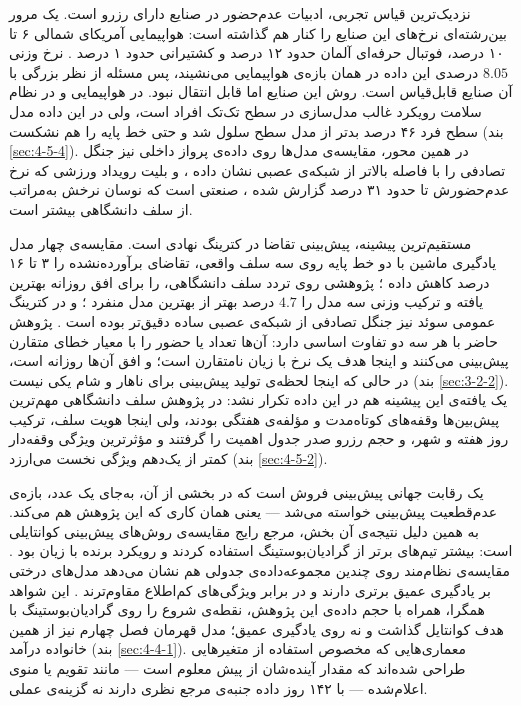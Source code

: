 نزدیک‌ترین قیاس تجربی، ادبیات عدم‌حضور در صنایع دارای رزرو است. یک مرور بین‌رشته‌ای
نرخ‌های این صنایع را کنار هم گذاشته است: هواپیمایی آمریکای شمالی ۶ تا ۱۰ درصد، فوتبال
حرفه‌ای آلمان حدود ۱۲ درصد و کشتیرانی حدود ۱ درصد \cite{Amberger22noshow}. نرخ وزنی
$8.05$ درصدی این داده در همان بازه‌ی هواپیمایی می‌نشیند، پس مسئله از نظر بزرگی با آن
صنایع قابل‌قیاس است. روش این صنایع اما قابل انتقال نبود. در هواپیمایی
\cite{Lawrence03noshow} و در نظام سلامت \cite{CarrerasGarcia20noshow} رویکرد غالب
مدل‌سازی در سطح تک‌تک افراد است، ولی در این داده مدل سطح فرد ۴۶ درصد بدتر از مدل سطح
سلول شد و حتی خط پایه را هم نشکست (بند \ref{sec:4-5-4}). در همین محور، مقایسه‌ی
مدل‌ها روی داده‌ی پرواز داخلی نیز جنگل تصادفی را با فاصله بالاتر از شبکه‌ی عصبی نشان
داده \cite{Chin23noshow}، و بلیت رویداد ورزشی که نرخ عدم‌حضورش تا حدود ۳۱ درصد گزارش
شده \cite{Popp23tickets}، صنعتی است که نوسان نرخش به‌مراتب از سلف دانشگاهی بیشتر است.

مستقیم‌ترین پیشینه، پیش‌بینی تقاضا در کترینگ نهادی است. مقایسه‌ی چهار مدل یادگیری
ماشین با دو خط پایه روی سه سلف واقعی، تقاضای برآورده‌نشده را ۳ تا ۱۶ درصد کاهش داده
\cite{Rodrigues24catering}؛ پژوهشی روی تردد سلف دانشگاهی،  را برای افق
روزانه بهترین یافته و ترکیب وزنی سه مدل را $4.7$ درصد بهتر از بهترین مدل منفرد
\cite{OPUS25cafeteria}؛ و در کترینگ عمومی سوئد نیز جنگل تصادفی از شبکه‌ی عصبی ساده
دقیق‌تر بوده است \cite{Malefors22catering}. پژوهش حاضر با هر سه دو تفاوت اساسی دارد:
آن‌ها تعداد یا حضور را با معیار خطای متقارن پیش‌بینی می‌کنند و اینجا هدف یک نرخ با
زیان نامتقارن است؛ و افق آن‌ها روزانه است، در حالی که اینجا لحظه‌ی تولید پیش‌بینی برای
ناهار و شام یکی نیست (بند \ref{sec:3-2-2}). یک یافته‌ی این پیشینه هم در این داده تکرار
نشد: در پژوهش سلف دانشگاهی مهم‌ترین پیش‌بین‌ها وقفه‌های کوتاه‌مدت و مؤلفه‌ی هفتگی
بودند، ولی اینجا هویت سلف، ترکیب روز هفته و شهر، و حجم رزرو صدر جدول اهمیت را گرفتند و
مؤثرترین ویژگی وقفه‌دار کمتر از یک‌دهم ویژگی نخست می‌ارزد (بند \ref{sec:4-5-2}).

 یک رقابت جهانی پیش‌بینی فروش است که در بخشی از آن، به‌جای یک عدد، بازه‌ی
عدم‌قطعیت پیش‌بینی خواسته می‌شد — یعنی همان کاری که این پژوهش هم می‌کند. به همین دلیل
نتیجه‌ی آن بخش، مرجع رایج مقایسه‌ی روش‌های پیش‌بینی کوانتایلی است: بیشتر تیم‌های برتر از
گرادیان‌بوستینگ استفاده کردند \cite{Makridakis22m5unc} و رویکرد برنده  با
زیان  بود \cite{Lainder22m5win}. مقایسه‌ی نظام‌مند روی
چندین مجموعه‌داده‌ی جدولی هم نشان می‌دهد مدل‌های درختی بر یادگیری عمیق برتری دارند و در
برابر ویژگی‌های کم‌اطلاع مقاوم‌ترند \cite{Grinsztajn22tabular}. این شواهد همگرا، همراه
با حجم داده‌ی این پژوهش، نقطه‌ی شروع را روی گرادیان‌بوستینگ با هدف کوانتایل گذاشت و نه
روی یادگیری عمیق؛ مدل قهرمان فصل چهارم نیز از همین خانواده درآمد (بند
\ref{sec:4-4-1}). معماری‌هایی که مخصوص استفاده از متغیرهایی طراحی شده‌اند که مقدار
آینده‌شان از پیش معلوم است — مانند تقویم یا منوی اعلام‌شده — با ۱۴۲ روز داده جنبه‌ی مرجع
نظری دارند نه گزینه‌ی عملی.

